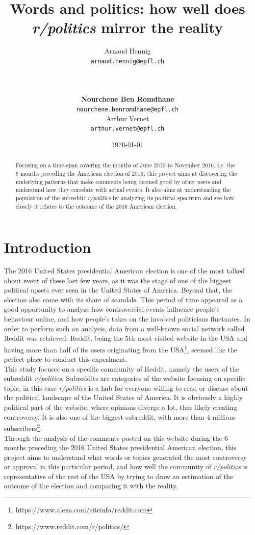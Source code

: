 \documentclass[11pt]{article}
\title{Words and politics: how well does \textit{r/politics} mirror the reality}
\author{Arnaud Hennig \\
  {\tt arnaud.hennig@epfl.ch} \\\And
    \\
  {\tt  } \\\\
  \textbf{Nourchene Ben Romdhane} \\
  {\tt nourchene.benromdhane@epfl.ch} \\\And
Arthur Vernet \\
{\tt arthur.vernet@epfl.ch} \\}
\date{\today}
\begin{document}
\maketitle
\begin{abstract}
Focusing on a time-span covering the months of June 2016 to November 2016, i.e. the 6 months preceding the American election of 2016, this project aims at discovering the underlying patterns that make comments being deemed good by other users and understand how they correlate with actual events. It also aims at understanding the population of the subreddit \textit{r/politics} by analyzing its political spectrum and see how closely it relates to the outcome of the 2016 American election.
\end{abstract}

\section{Introduction}
The 2016 United States presidential American election is one of the most talked about event of these last few years, as it was the stage of one of the biggest political upsets ever seen in the United States of America. Beyond that, the election also came with its share of scandals.
This period of time appeared as a good opportunity to analyze how controversial events influence people's behaviour online, and how people's takes on the involved politicians fluctuates. In order to perform such an analysis, data from a well-known social network called Reddit was retrieved. Reddit, being the 5th most visited website in the USA and having more than half of its users originating from the USA\footnote{https://www.alexa.com/siteinfo/reddit.com}, seemed like the perfect place to conduct this experiment. \\
This study focuses on a specific community of Reddit, namely the users of the subreddit \textit{r/politics}. Subreddits are categories of the website focusing on specific topic, in this case \textit{r/politics} is a hub for everyone willing to read or discuss about the political landscape of the United States of America. It is obviously a highly political part of the website, where opinions diverge a lot, thus likely creating controversy. It is also one of the biggest subreddit, with more than 4 millions subscribers\footnote{https://www.reddit.com/r/politics/}. \\
Through the analysis of the comments posted on this website during the 6 months preceding the 2016 United States presidential American election, this project aims to understand what words or topics generated the most controversy or approval in this particular period, and how well the community of \textit{r/politics} is representative of the rest of the USA by trying to draw an estimation of the outcome of the election and comparing it with the reality. 
\end{document}
